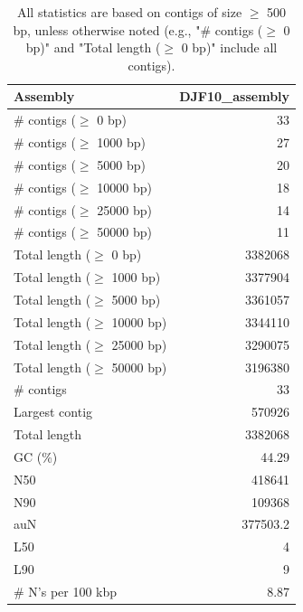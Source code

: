 \documentclass[12pt,a4paper]{article}
\begin{document}
\begin{table}[ht]
\begin{center}
\caption{All statistics are based on contigs of size $\geq$ 500 bp, unless otherwise noted (e.g., "\# contigs ($\geq$ 0 bp)" and "Total length ($\geq$ 0 bp)" include all contigs).}
\begin{tabular}{|l*{1}{|r}|}
\hline
Assembly & DJF10\_assembly \\ \hline
\# contigs ($\geq$ 0 bp) & 33 \\ \hline
\# contigs ($\geq$ 1000 bp) & 27 \\ \hline
\# contigs ($\geq$ 5000 bp) & 20 \\ \hline
\# contigs ($\geq$ 10000 bp) & 18 \\ \hline
\# contigs ($\geq$ 25000 bp) & 14 \\ \hline
\# contigs ($\geq$ 50000 bp) & 11 \\ \hline
Total length ($\geq$ 0 bp) & 3382068 \\ \hline
Total length ($\geq$ 1000 bp) & 3377904 \\ \hline
Total length ($\geq$ 5000 bp) & 3361057 \\ \hline
Total length ($\geq$ 10000 bp) & 3344110 \\ \hline
Total length ($\geq$ 25000 bp) & 3290075 \\ \hline
Total length ($\geq$ 50000 bp) & 3196380 \\ \hline
\# contigs & 33 \\ \hline
Largest contig & 570926 \\ \hline
Total length & 3382068 \\ \hline
GC (\%) & 44.29 \\ \hline
N50 & 418641 \\ \hline
N90 & 109368 \\ \hline
auN & 377503.2 \\ \hline
L50 & 4 \\ \hline
L90 & 9 \\ \hline
\# N's per 100 kbp & 8.87 \\ \hline
\end{tabular}
\end{center}
\end{table}
\end{document}
